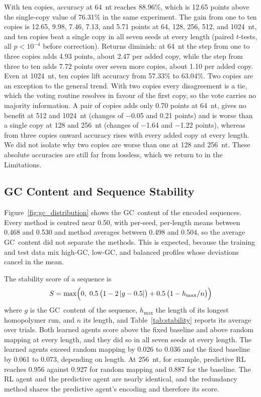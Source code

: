 \documentclass[entropy,article,submit,moreauthors]{Definitions/mdpi}
\begin{document}
With ten copies, accuracy at 64~nt reaches 88.96\%, which is 12.65 points above the single-copy value of 76.31\% in the same experiment. The gain from one to ten copies is 12.65, 9.98, 7.46, 7.13, and 5.71 points at 64, 128, 256, 512, and 1024~nt, and ten copies beat a single copy in all seven seeds at every length (paired $t$-tests, all $p < 10^{-4}$ before correction). Returns diminish: at 64~nt the step from one to three copies adds 4.93 points, about 2.47 per added copy, while the step from three to ten adds 7.72 points over seven more copies, about 1.10 per added copy. Even at 1024~nt, ten copies lift accuracy from 57.33\% to 63.04\%. Two copies are an exception to the general trend. With two copies every disagreement is a tie, which the voting routine resolves in favour of the first copy, so the vote carries no majority information. A pair of copies adds only 0.70 points at 64~nt, gives no benefit at 512 and 1024~nt (changes of $-$0.05 and 0.21 points) and is worse than a single copy at 128 and 256~nt (changes of $-$1.64 and $-$1.22 points), whereas from three copies onward accuracy rises with every added copy at every length. We did not isolate why two copies are worse than one at 128 and 256~nt. These absolute accuracies are still far from lossless, which we return to in the Limitations.

\subsection{GC Content and Sequence Stability}

Figure~\ref{fig:gc_distribution} shows the GC~content of the encoded sequences. Every method is centred near 0.50, with per-seed, per-length means between 0.468 and 0.530 and method averages between 0.498 and 0.504, so the average GC~content did not separate the methods. This is expected, because the training and test data mix high-GC, low-GC, and balanced profiles whose deviations cancel in the mean.

The stability score of a sequence is
\begin{equation}
    S = \max\Bigl(0,\; 0.5\,\bigl(1 - 2\,|g - 0.5|\bigr) + 0.5\,\bigl(1 - h_{\max}/n\bigr)\Bigr)
    \label{eq:stability}
\end{equation}
where $g$ is the GC~content of the sequence, $h_{\max}$ the length of its longest homopolymer run, and $n$ its length, and Table~\ref{tab:stability} reports its average over trials. Both learned agents score above the fixed baseline and above random mapping at every length, and they did so in all seven seeds at every length. The learned agents exceed random mapping by 0.026 to 0.036 and the fixed baseline by 0.061 to 0.073, depending on length. At 256~nt, for example, predictive RL reaches 0.956 against 0.927 for random mapping and 0.887 for the baseline. The RL agent and the predictive agent are nearly identical, and the redundancy method shares the predictive agent's encoding and therefore its score.
\end{document}
